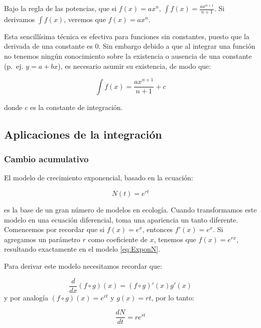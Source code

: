 \documentclass[
]{book}
\begin{document}
Bajo la regla de las potencias, que si \(f(x) = ax^n\), \(\int f(x) = \frac{ax^{n+1}}{n+1}\). Si derivamos \(\int f(x)\), veremos que \(f(x) = ax^n\).

Esta sencillísima técnica es efectiva para funciones sin constantes, puesto que la derivada de una constante es 0. Sin embargo debido a que al integrar una función no tenemos ningún conocimiento sobre la existencia o ausencia de una constante (p.~ej. \(y = a + bx\)), es necesario asumir su existencia, de modo que:

\begin{equation}
\int f(x) = \frac{ax^{n+1}}{n+1} + c
\end{equation}

donde \(c\) es la constante de integración.

\hypertarget{aplicaciones-de-la-integraciuxf3n}{%
\subsection{Aplicaciones de la integración}\label{aplicaciones-de-la-integraciuxf3n}}

\hypertarget{cambio-acumulativo}{%
\subsubsection{Cambio acumulativo}\label{cambio-acumulativo}}

El modelo de crecimiento exponencial, basado en la ecuación:

\begin{equation}
    N(t) = e^{rt} \label{eq:ExponN}
\end{equation}

es la base de un gran número de modelos en ecología. Cuando transformamos este modelo en una ecuación diferencial, toma una apariencia un tanto diferente. Comencemos por recordar que si \(f(x) = e^x\), entonces \(f'(x) = e^x\). Si agregamos un parámetro \(r\) como coeficiente de \(x\), tenemos que \(f(x)= e^{rx}\), resultando exactamente en el modelo \eqref{eq:ExponN}.

Para derivar este modelo necesitamos recordar que:

\[\frac{d}{dx}(f \circ g)(x) = (f \circ g)'(x)g'(x)\]
y por analogía \((f \circ g)(x) = e^{rt}\) y \(g(x) = rt\), por lo tanto:

\begin{equation}
\frac{dN}{dt} = r e^{rt}
\end{equation}
\end{document}
